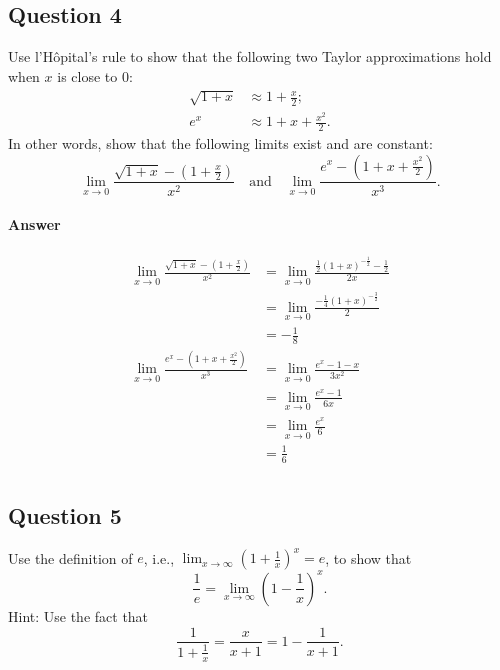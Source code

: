 \subsection{Question 4}
Use l'H\^{o}pital's rule to show that the following two Taylor approximations
    hold when $ x $ is close to 0:
\begin{align*}
    \sqrt{1 + x} &\approx 1 + \frac{x}{2}; \\
    e^x &\approx 1 + x + \frac{x^2}{2}.
\end{align*}
In other words, show that the following limits exist and are constant:
\begin{equation*}
    \lim_{x \rightarrow 0} \frac{\sqrt{1 + x} - (1 + \frac{x}{2})}{x^2} \quad
        \text{and} \quad \lim_{x \rightarrow 0} \frac{e^x - (1 + x +
        \frac{x^2}{2})}{x^3}.
\end{equation*}

\paragraph{Answer}
\begin{align*}
    \lim_{x \rightarrow 0} \frac{\sqrt{1 + x} - (1 + \frac{x}{2})}{x^2}
        &= \lim_{x \rightarrow 0} \frac{\frac{1}{2} (1 + x)^{-\frac{1}{2}} -
            \frac{1}{2}}{2 x} \\
        &= \lim_{x \rightarrow 0} \frac{-\frac{1}{4}
            (1 + x)^{-\frac{3}{2}}}{2} \\
        &= -\frac{1}{8} \\
    \lim_{x \rightarrow 0} \frac{e^x - (1 + x + \frac{x^2}{2})}{x^3}
        &= \lim_{x \rightarrow 0} \frac{e^x - 1 - x}{3 x^2} \\
        &= \lim_{x \rightarrow 0} \frac{e^x - 1}{6 x} \\
        &= \lim_{x \rightarrow 0} \frac{e^x}{6} \\
        &= \frac{1}{6} \\
\end{align*}

\subsection{Question 5}
Use the definition of $ e $, i.e., $ \lim_{x \rightarrow \infty} \left( 1 +
    \frac{1}{x} \right)^x = e $, to show that
\begin{equation*}
    \frac{1}{e} = \lim_{x \rightarrow \infty} \left( 1 - \frac{1}{x} \right)^x.
\end{equation*}
Hint: Use the fact that
\begin{equation*}
    \frac{1}{1 + \frac{1}{x}} = \frac{x}{x + 1} = 1 - \frac{1}{x + 1}.
\end{equation*}

